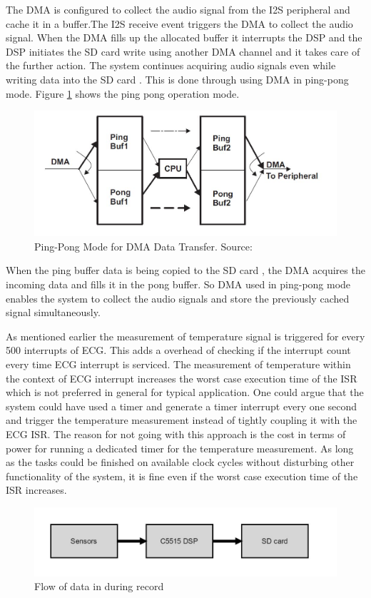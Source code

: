  The DMA is configured to collect the audio signal from the I2S peripheral and cache it in a buffer.The I2S receive event triggers the DMA to collect the audio signal. When the DMA fills up the allocated buffer it interrupts the DSP and the DSP initiates the SD card write using another DMA channel and it takes care of the further action. The system continues acquiring audio signals even while writing data into the SD card . This is done through using DMA in ping-pong mode. Figure \ref{ping_pong} shows the ping pong operation mode.
  \begin{figure}[h]
 	\centering
 	\includegraphics[scale = 0.5 ]{ping_pong.JPG}
 	\caption{Ping-Pong Mode for DMA Data Transfer. Source:\cite{dma}\label{ping_pong}}
 \end{figure}
 When the ping buffer data is being copied to the SD card , the DMA acquires the incoming data and fills it in the pong buffer. So DMA used in ping-pong mode enables the system to collect the audio signals and store the previously cached signal simultaneously. 
 
 As mentioned earlier the measurement of temperature signal is triggered for every 500 interrupts of ECG. This adds a overhead of checking if the interrupt count every time ECG interrupt is serviced. The measurement of temperature within the context of ECG interrupt increases the worst case execution time of the ISR which is not preferred in general for typical application. One could argue that the system could have used a timer and generate a timer interrupt every one second and trigger the temperature measurement instead of tightly coupling it with the ECG ISR. The reason for not going with this approach is the cost in terms of power for running a dedicated timer for the temperature measurement. As long as the tasks could be finished on available clock cycles without disturbing other functionality of the system, it is fine even if the worst case execution time of the ISR increases.
 \begin{figure}[h]
 	\centering
 	\includegraphics[scale = 0.5 ]{record_dataflow.JPG}
 	\caption{Flow of data in during record\label{record_datalow}}
 \end{figure}

